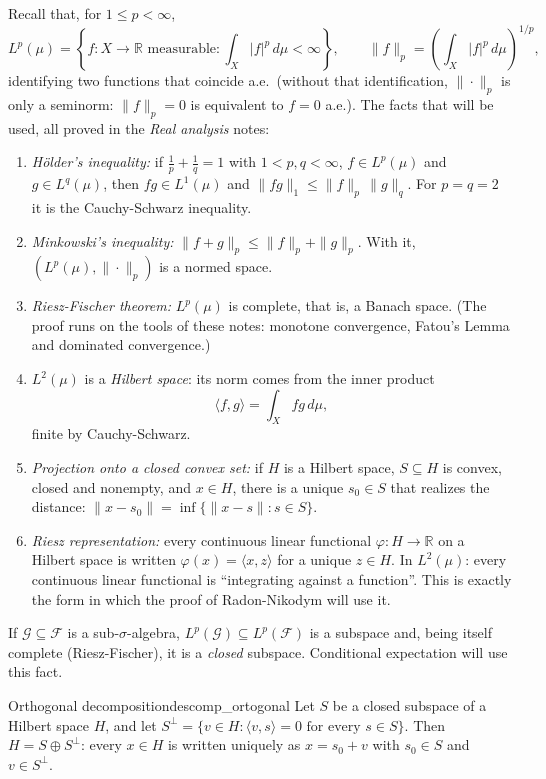 \documentclass[11pt, a4paper]{article}
\begin{document}
Recall that, for $1 \le p < \infty$,
$$ L^p(\mu) = \left\{ f : X \to \mathbb{R} \text{ measurable} : \int_X |f|^p \, d\mu < \infty
\right\}, \qquad \|f\|_p = \left( \int_X |f|^p \, d\mu \right)^{1/p}, $$
identifying two functions that coincide a.e.\ (without that identification, $\|\cdot\|_p$ is
only a seminorm: $\|f\|_p = 0$ is equivalent to $f = 0$ a.e.). The facts that will be used, all
proved in the \emph{Real analysis} notes:

\begin{enumerate}
    \item \emph{Hölder's inequality:} if $\tfrac{1}{p} + \tfrac{1}{q} = 1$ with
    $1 < p, q < \infty$, $f \in L^p(\mu)$ and $g \in L^q(\mu)$, then $fg \in L^1(\mu)$ and
    $\|fg\|_1 \le \|f\|_p \, \|g\|_q$. For $p = q = 2$ it is the Cauchy-Schwarz inequality.
    \item \emph{Minkowski's inequality:} $\|f + g\|_p \le \|f\|_p + \|g\|_p$. With it,
    $(L^p(\mu), \|\cdot\|_p)$ is a normed space.
    \item \emph{Riesz-Fischer theorem:} $L^p(\mu)$ is complete, that is, a Banach
    space. (The proof runs on the tools of these notes: monotone
    convergence, Fatou's Lemma and dominated convergence.)
    \item $L^2(\mu)$ is a \emph{Hilbert space}: its norm comes from the inner product
    $$ \langle f, g \rangle = \int_X f g \, d\mu, $$
    finite by Cauchy-Schwarz.
    \item \emph{Projection onto a closed convex set:} if $H$ is a Hilbert space,
    $S \subseteq H$ is convex, closed and nonempty, and $x \in H$, there is a unique $s_0 \in S$
    that realizes the distance: $\|x - s_0\| = \inf\{\|x - s\| : s \in S\}$.
    \item \emph{Riesz representation:} every continuous linear functional
    $\varphi: H \to \mathbb{R}$ on a Hilbert space is written $\varphi(x) =
    \langle x, z \rangle$ for a unique $z \in H$. In $L^2(\mu)$: every continuous linear
    functional is ``integrating against a function''. This is exactly the form in which
    the proof of Radon-Nikodym will use it.
\end{enumerate}

\obs If $\mathcal{G} \subseteq \mathcal{F}$ is a sub-$\sigma$-algebra,
$L^p(\mathcal{G}) \subseteq L^p(\mathcal{F})$ is a subspace and, being itself complete
(Riesz-Fischer), it is a \emph{closed} subspace. Conditional expectation will use
this fact.

\begin{teorema}{Orthogonal decomposition}{descomp_ortogonal}
Let $S$ be a closed subspace of a Hilbert space $H$, and let
$S^\perp = \{v \in H : \langle v, s \rangle = 0 \text{ for every } s \in S\}$. Then
$H = S \oplus S^\perp$: every $x \in H$ is written uniquely as $x = s_0 + v$ with
$s_0 \in S$ and $v \in S^\perp$.
\end{teorema}
\end{document}
